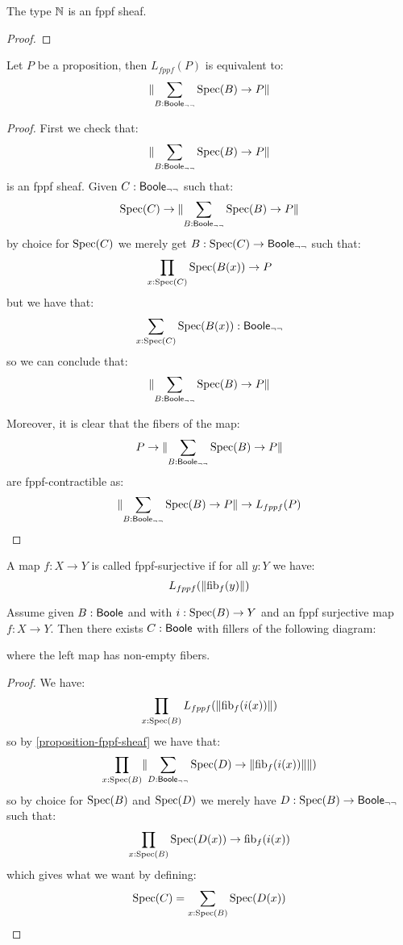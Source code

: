 \begin{lemma}\label{nat-sheaf}
The type $\mathbb{N}$ is an fppf sheaf.
\end{lemma}

\begin{proof}
\end{proof}

\begin{lemma}\label{proposition-fppf-sheaf}
Let $P$ be a proposition, then $L_{fppf}(P)$ is equivalent to:
\[\lVert \sum_{B:\mathsf{Boole}_{\neg\neg}} \operatorname{Spec}(B)\to P \rVert\]
\end{lemma}

\begin{proof}
First we check that: 
\[\lVert \sum_{B:\mathsf{Boole}_{\neg\neg}}\operatorname{Spec}(B)\to P \rVert\]
is an fppf sheaf. Given $C:\mathsf{Boole}_{\neg\neg}$ such that:
\[\operatorname{Spec}(C)\to \lVert \sum_{B:\mathsf{Boole}_{\neg\neg}}\operatorname{Spec}(B)\to P \rVert\]
by choice for $\operatorname{Spec}(C)$ we merely get $B:\operatorname{Spec}(C)\to \mathsf{Boole}_{\neg\neg}$ such that:
\[\prod_{x:\operatorname{Spec}(C)}\operatorname{Spec}(B(x))\to P\]
but we have that:
\[\sum_{x:\operatorname{Spec}(C)}\operatorname{Spec}(B(x)):\mathsf{Boole}_{\neg\neg}\]
so we can conclude that:
\[\lVert \sum_{B:\mathsf{Boole}_{\neg\neg}}\operatorname{Spec}(B)\to P \rVert\]

Moreover, it is clear that the fibers of the map:
\[P\to \lVert \sum_{B:\mathsf{Boole}_{\neg\neg}}\operatorname{Spec}(B)\to P \rVert\] 
are fppf-contractible as:
\[\lVert \sum_{B:\mathsf{Boole}_{\neg\neg}}\operatorname{Spec}(B)\to P \rVert\to L_{fppf}(P)\]
\end{proof}

\begin{definition}
A map $f:X\to Y$ is called fppf-surjective if for all $y:Y$ we have: 
\[L_{fppf}(\lVert \mathrm{fib}_f(y) \rVert)\]
\end{definition}

\begin{lemma}\label{fppf-local-choice}
Assume given $B:\mathsf{Boole}$ and with $i:\operatorname{Spec}(B)\to Y$ and an fppf surjective map $f:X\to Y$. Then there exists $C:\mathsf{Boole}$ with fillers of the following diagram:
\begin{center}
\end{center}
where the left map has non-empty fibers.
\end{lemma}

\begin{proof}
We have:
\[\prod_{x:\operatorname{Spec}(B)} L_{fppf}(\lVert \mathrm{fib}_f(i(x)) \rVert)\]
so by \cref{proposition-fppf-sheaf} we have that:
\[\prod_{x:\operatorname{Spec}(B)} \lVert \sum_{D:\mathsf{Boole}_{\neg\neg}} \operatorname{Spec}(D)\to \lVert \mathrm{fib}_f(i(x)) \rVert \rVert)\]
so by choice for $\operatorname{Spec}(B)$ and $\operatorname{Spec}(D)$ we merely have $D:\operatorname{Spec}(B)\to \mathsf{Boole}_{\neg\neg}$ such that:
\[\prod_{x:\operatorname{Spec}(B)} \operatorname{Spec}(D(x))\to \mathrm{fib}_f(i(x))\]
which gives what we want by defining:
\[\operatorname{Spec}(C) = \sum_{x:\operatorname{Spec}(B)}\operatorname{Spec}(D(x))\]
\end{proof}

